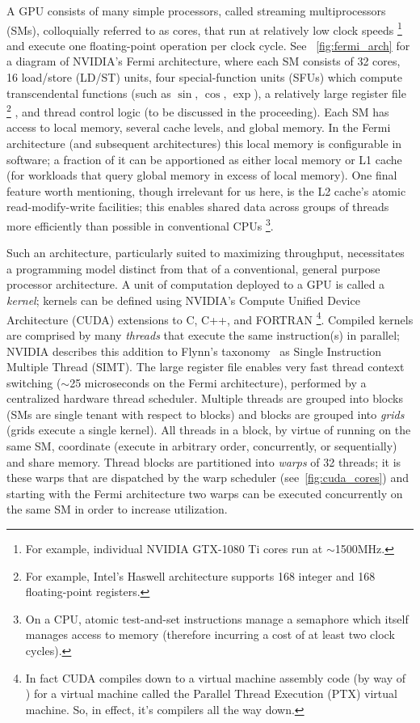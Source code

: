 \documentclass[sigconf]{acmart}
\begin{document}
A GPU consists of many simple processors, called streaming multiprocessors (SMs), colloquially referred to as cores, that run at relatively low clock speeds%
\footnote{For example, individual NVIDIA GTX-1080 Ti cores run at $\sim$1500MHz.}
and execute one floating-point operation per clock cycle.
See ~\cref{fig:fermi_arch} for a diagram of NVIDIA's Fermi architecture, where each SM consists of 32 cores, 16 load/store (LD/ST) units, four special-function units (SFUs) which compute transcendental functions (such as $\sin$, $\cos$, $\exp$), a relatively large register file%
\footnote{For example, Intel's Haswell architecture supports 168 integer and 168 floating-point registers.}%
, and thread control logic (to be discussed in the proceeding).
Each SM has access to local memory, several cache levels, and global memory.
In the Fermi architecture (and subsequent architectures) this local memory is configurable in software;
a fraction of it can be apportioned as either local memory or L1 cache (for workloads that query global memory in excess of local memory).
One final feature worth mentioning, though irrelevant for us here, is the L2 cache's atomic read-modify-write facilities;
this enables shared data across groups of threads more efficiently than possible in conventional CPUs%
\footnote{On a CPU, atomic test-and-set instructions manage a semaphore which itself manages access to memory (therefore incurring a cost of at least two clock cycles).}.

Such an architecture, particularly suited to maximizing throughput, necessitates a programming model distinct from that of a conventional, general purpose processor architecture.
A unit of computation deployed to a GPU is called a \textit{kernel}; kernels can be defined using NVIDIA's Compute Unified Device Architecture (CUDA) extensions to C, C++, and FORTRAN%
\footnote{In fact CUDA compiles down to a virtual machine assembly code (by way of ) for a virtual machine called the Parallel Thread Execution (PTX) virtual machine. So, in effect, it's compilers all the way down.}.
Compiled kernels are comprised by many \textit{threads} that execute the same instruction(s) in parallel;
NVIDIA describes this addition to Flynn's taxonomy~\cite{5009071} as Single Instruction Multiple Thread (SIMT).
The large register file enables very fast thread context switching ($\sim$25 microseconds on the Fermi architecture), performed by a centralized hardware thread scheduler.
Multiple threads are grouped into blocks (SMs are single tenant with respect to blocks) and blocks are grouped into \textit{grids} (grids execute a single kernel).
All threads in a block, by virtue of running on the same SM, coordinate (execute in arbitrary order, concurrently, or sequentially) and share memory.
Thread blocks are partitioned into \textit{warps} of 32 threads;
it is these warps that are dispatched by the warp scheduler (see~\cref{fig:cuda_cores}) and starting with the Fermi architecture two warps can be executed concurrently on the same SM in order to increase utilization.
\end{document}
